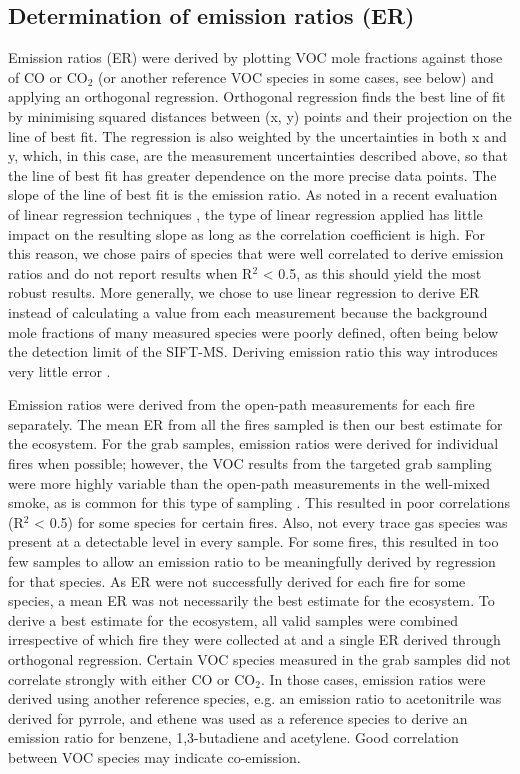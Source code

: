 \documentclass[acp, manuscript]{copernicus}
\begin{document}
\subsection{Determination of emission ratios (ER)} \label{sec:ER_calc}
Emission ratios (ER) were derived by plotting VOC mole fractions against those of CO or CO$_2$ (or another reference VOC species in some cases, see below) and applying an orthogonal regression. Orthogonal regression finds the best line of fit by minimising squared distances between (x, y) points and their projection on the line of best fit. The regression is also weighted by the uncertainties in both x and y, which, in this case, are the measurement uncertainties described above, so that the line of best fit has greater dependence on the more precise data points. The slope of the line of best fit is the emission ratio. As noted in a recent evaluation of linear regression techniques \citep{Wu2017}, the type of linear regression applied has little impact on the resulting slope as long as the correlation coefficient is high. For this reason, we chose pairs of species that were well correlated to derive emission ratios and do not report results when R$^2$ < 0.5, as this should yield the most robust results. More generally, we chose to use linear regression to derive ER instead of calculating a value from each measurement \citep[e.g.][]{Burling2011} because the background mole fractions of many measured species were poorly defined, often being below the detection limit of the SIFT-MS. Deriving emission ratio this way introduces very little error \citep[< $0.1 \%$,][]{Wooster2011}.

Emission ratios were derived from the open-path measurements for each fire separately. The mean ER from all the fires sampled is then our best estimate for the ecosystem. For the grab samples, emission ratios were derived for individual fires when possible; however, the VOC results from the targeted grab sampling were more highly variable than the open-path measurements in the well-mixed smoke, as is common for this type of sampling \citep{Yokelson2008,Yokelson2013,Burling2011,Akagi2013}. This resulted in poor correlations (R$^2$ < 0.5) for some species for certain fires. Also, not every trace gas species was present at a detectable level in every sample. For some fires, this resulted in too few samples to allow an emission ratio to be meaningfully derived by regression for that species. As ER were not successfully derived for each fire for some species, a mean ER was not necessarily the best estimate for the ecosystem. To derive a best estimate for the ecosystem, all valid samples were combined irrespective of which fire they were collected at and a single ER derived through orthogonal regression. 
Certain VOC species measured in the grab samples did not correlate strongly with either CO or CO$_2$. In those cases, emission ratios were derived using another reference species, e.g. an emission ratio to acetonitrile was derived for pyrrole, and ethene was used as a reference species to derive an emission ratio for benzene, 1,3-butadiene and acetylene. Good correlation between VOC species may indicate co-emission. 
\end{document}
